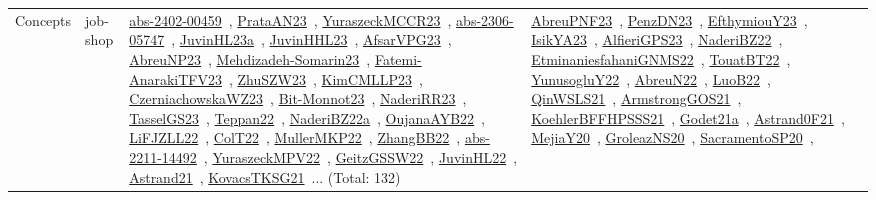 {\begin{longtable}{lp{3cm}>{\raggedright\arraybackslash}p{6cm}>{\raggedright\arraybackslash}p{6cm}>{\raggedright\arraybackslash}p{8cm}}
Concepts & job-shop & \href{../works/abs-2402-00459.pdf}{abs-2402-00459}~\cite{abs-2402-00459}, \href{../works/PrataAN23.pdf}{PrataAN23}~\cite{PrataAN23}, \href{../works/YuraszeckMCCR23.pdf}{YuraszeckMCCR23}~\cite{YuraszeckMCCR23}, \href{../works/abs-2306-05747.pdf}{abs-2306-05747}~\cite{abs-2306-05747}, \href{../works/JuvinHL23a.pdf}{JuvinHL23a}~\cite{JuvinHL23a}, \href{../works/JuvinHHL23.pdf}{JuvinHHL23}~\cite{JuvinHHL23}, \href{../works/AfsarVPG23.pdf}{AfsarVPG23}~\cite{AfsarVPG23}, \href{../works/AbreuNP23.pdf}{AbreuNP23}~\cite{AbreuNP23}, \href{../works/Mehdizadeh-Somarin23.pdf}{Mehdizadeh-Somarin23}~\cite{Mehdizadeh-Somarin23}, \href{../works/Fatemi-AnarakiTFV23.pdf}{Fatemi-AnarakiTFV23}~\cite{Fatemi-AnarakiTFV23}, \href{../works/ZhuSZW23.pdf}{ZhuSZW23}~\cite{ZhuSZW23}, \href{../works/KimCMLLP23.pdf}{KimCMLLP23}~\cite{KimCMLLP23}, \href{../works/CzerniachowskaWZ23.pdf}{CzerniachowskaWZ23}~\cite{CzerniachowskaWZ23}, \href{../works/Bit-Monnot23.pdf}{Bit-Monnot23}~\cite{Bit-Monnot23}, \href{../works/NaderiRR23.pdf}{NaderiRR23}~\cite{NaderiRR23}, \href{../works/TasselGS23.pdf}{TasselGS23}~\cite{TasselGS23}, \href{../works/Teppan22.pdf}{Teppan22}~\cite{Teppan22}, \href{../works/NaderiBZ22a.pdf}{NaderiBZ22a}~\cite{NaderiBZ22a}, \href{../works/OujanaAYB22.pdf}{OujanaAYB22}~\cite{OujanaAYB22}, \href{../works/LiFJZLL22.pdf}{LiFJZLL22}~\cite{LiFJZLL22}, \href{../works/ColT22.pdf}{ColT22}~\cite{ColT22}, \href{../works/MullerMKP22.pdf}{MullerMKP22}~\cite{MullerMKP22}, \href{../works/ZhangBB22.pdf}{ZhangBB22}~\cite{ZhangBB22}, \href{../works/abs-2211-14492.pdf}{abs-2211-14492}~\cite{abs-2211-14492}, \href{../works/YuraszeckMPV22.pdf}{YuraszeckMPV22}~\cite{YuraszeckMPV22}, \href{../works/GeitzGSSW22.pdf}{GeitzGSSW22}~\cite{GeitzGSSW22}, \href{../works/JuvinHL22.pdf}{JuvinHL22}~\cite{JuvinHL22}, \href{../works/Astrand21.pdf}{Astrand21}~\cite{Astrand21}, \href{../works/KovacsTKSG21.pdf}{KovacsTKSG21}~\cite{KovacsTKSG21}... (Total: 132) & \href{../works/AbreuPNF23.pdf}{AbreuPNF23}~\cite{AbreuPNF23}, \href{../works/PenzDN23.pdf}{PenzDN23}~\cite{PenzDN23}, \href{../works/EfthymiouY23.pdf}{EfthymiouY23}~\cite{EfthymiouY23}, \href{../works/IsikYA23.pdf}{IsikYA23}~\cite{IsikYA23}, \href{../works/AlfieriGPS23.pdf}{AlfieriGPS23}~\cite{AlfieriGPS23}, \href{../works/NaderiBZ22.pdf}{NaderiBZ22}~\cite{NaderiBZ22}, \href{../works/EtminaniesfahaniGNMS22.pdf}{EtminaniesfahaniGNMS22}~\cite{EtminaniesfahaniGNMS22}, \href{../works/TouatBT22.pdf}{TouatBT22}~\cite{TouatBT22}, \href{../works/YunusogluY22.pdf}{YunusogluY22}~\cite{YunusogluY22}, \href{../works/AbreuN22.pdf}{AbreuN22}~\cite{AbreuN22}, \href{../works/LuoB22.pdf}{LuoB22}~\cite{LuoB22}, \href{../works/QinWSLS21.pdf}{QinWSLS21}~\cite{QinWSLS21}, \href{../works/ArmstrongGOS21.pdf}{ArmstrongGOS21}~\cite{ArmstrongGOS21}, \href{../works/KoehlerBFFHPSSS21.pdf}{KoehlerBFFHPSSS21}~\cite{KoehlerBFFHPSSS21}, \href{../works/Godet21a.pdf}{Godet21a}~\cite{Godet21a}, \href{../works/Astrand0F21.pdf}{Astrand0F21}~\cite{Astrand0F21}, \href{../works/MejiaY20.pdf}{MejiaY20}~\cite{MejiaY20}, \href{../works/GroleazNS20.pdf}{GroleazNS20}~\cite{GroleazNS20}, \href{../works/SacramentoSP20.pdf}{SacramentoSP20}~\cite{SacramentoSP20}, 
\end{longtable}}
